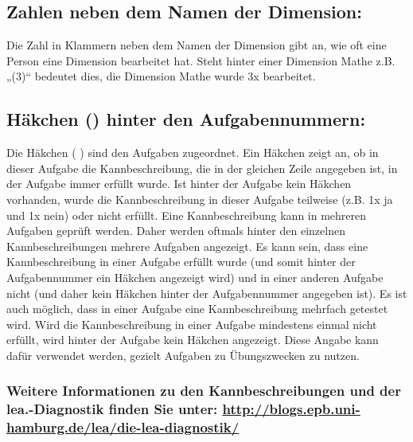 \documentclass{article}
\newcommand\cm{%
\checkmark
}
\begin{document}
{

\subsection*{Zahlen neben dem Namen der Dimension:}
Die Zahl in Klammern neben dem Namen der Dimension gibt an, wie oft eine Person eine Dimension bearbeitet hat. Steht hinter einer Dimension Mathe z.B. „(3)“ bedeutet dies, die Dimension Mathe wurde 3x bearbeitet.
\subsection*{Häkchen (\checkmark) hinter den Aufgabennummern:}
Die Häkchen (\cm) sind den Aufgaben zugeordnet. Ein Häkchen zeigt an, ob in dieser Aufgabe die Kannbeschreibung, die in der gleichen Zeile angegeben ist, in der Aufgabe immer erfüllt wurde. Ist hinter der Aufgabe kein Häkchen vorhanden, wurde die Kannbeschreibung in dieser Aufgabe teilweise (z.B. 1x ja und 1x nein) oder nicht erfüllt. Eine Kannbeschreibung kann in mehreren Aufgaben geprüft werden. Daher werden oftmals hinter den einzelnen Kannbeschreibungen mehrere Aufgaben angezeigt. Es kann sein, dass eine Kannbeschreibung in einer Aufgabe erfüllt wurde (und somit hinter der Aufgabennummer ein Häkchen angezeigt wird) und in einer anderen Aufgabe nicht (und daher kein Häkchen hinter der Aufgabennummer angegeben ist). Es ist auch möglich, dass in einer Aufgabe eine Kannbeschreibung mehrfach getestet wird. Wird die Kannbeschreibung in einer Aufgabe mindestens einmal nicht erfüllt, wird hinter der Aufgabe kein Häkchen angezeigt. Diese Angabe kann dafür verwendet werden, gezielt Aufgaben zu Übungszwecken zu nutzen.

\subsubsection*{Weitere Informationen zu den Kannbeschreibungen und der lea.-Diagnostik finden Sie unter: \underline{http://blogs.epb.uni-hamburg.de/lea/die-lea-diagnostik/}}}
\end{document}

